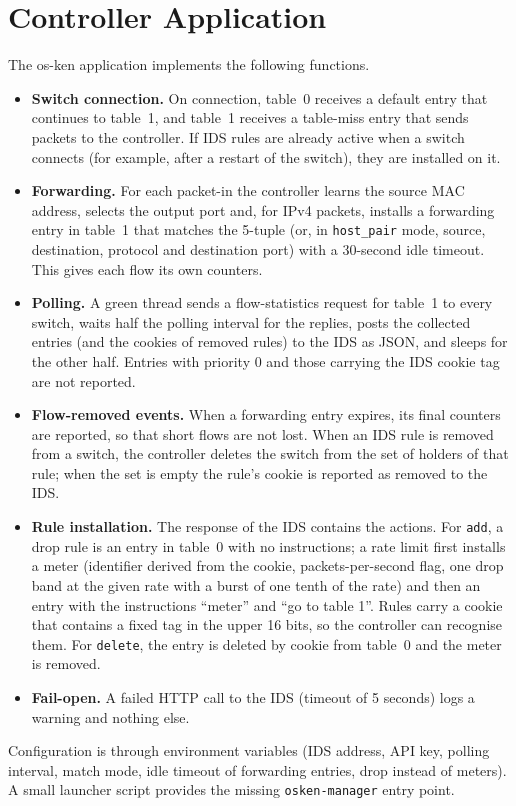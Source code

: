 \section{Controller Application}
The os-ken application implements the following functions.
\begin{itemize}
	\item \textbf{Switch connection.} On connection, table~0 receives a default entry that continues to table~1, and table~1 receives a table-miss entry that sends packets to the controller. If IDS rules are already active when a switch connects (for example, after a restart of the switch), they are installed on it.
	\item \textbf{Forwarding.} For each packet-in the controller learns the source MAC address, selects the output port and, for IPv4 packets, installs a forwarding entry in table~1 that matches the 5-tuple (or, in \texttt{host\_pair} mode, source, destination, protocol and destination port) with a 30-second idle timeout. This gives each flow its own counters.
	\item \textbf{Polling.} A green thread sends a flow-statistics request for table~1 to every switch, waits half the polling interval for the replies, posts the collected entries (and the cookies of removed rules) to the IDS as JSON, and sleeps for the other half. Entries with priority 0 and those carrying the IDS cookie tag are not reported.
	\item \textbf{Flow-removed events.} When a forwarding entry expires, its final counters are reported, so that short flows are not lost. When an IDS rule is removed from a switch, the controller deletes the switch from the set of holders of that rule; when the set is empty the rule's cookie is reported as removed to the IDS.
	\item \textbf{Rule installation.} The response of the IDS contains the actions. For \texttt{add}, a drop rule is an entry in table~0 with no instructions; a rate limit first installs a meter (identifier derived from the cookie, packets-per-second flag, one drop band at the given rate with a burst of one tenth of the rate) and then an entry with the instructions ``meter'' and ``go to table 1''. Rules carry a cookie that contains a fixed tag in the upper 16 bits, so the controller can recognise them. For \texttt{delete}, the entry is deleted by cookie from table~0 and the meter is removed.
	\item \textbf{Fail-open.} A failed HTTP call to the IDS (timeout of 5 seconds) logs a warning and nothing else.
\end{itemize}
Configuration is through environment variables (IDS address, API key, polling interval, match mode, idle timeout of forwarding entries, drop instead of meters). A small launcher script provides the missing \texttt{osken-manager} entry point.

